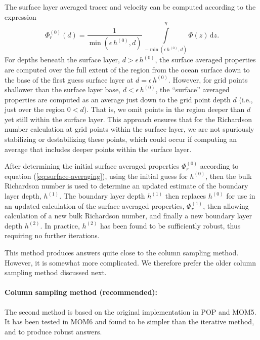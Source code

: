 The surface layer averaged tracer and velocity can be computed
according to the expression
\begin{equation}
   \Phi^{(0)}_{r}(d) = \frac{1}{\min(\epsilon \, h^{(0)}, d)} \, \int\limits^{\eta}_{-\min(\epsilon \, h^{(0)}, d)} \Phi(z) \, \mathrm{d}z.
\label{eq:surface-averaging-iterative}
\end{equation}
For depths beneath the surface layer, $d > \epsilon \, h^{(0)}$, the
surface averaged properties are computed over the full extent of the
region from the ocean surface down to the base of the first guess
surface layer at $d= \epsilon \, h^{(0)}$. However, for grid points
shallower than the surface layer base, $d < \epsilon \, h^{(0)}$, the
``surface'' averaged properties are computed as an average just down
to the grid point depth $d$ (i.e., just over the region $0 < d$).
That is, we omit points in the region deeper than $d$ yet still within
the surface layer.  This approach ensures that for the Richardson
number calculation at grid points within the surface layer, we are not
spuriously stabilizing or destabilizing these points, which could
occur if computing an average that includes deeper points within the
surface layer.

After determining the initial surface averaged properties
$\Phi^{(0)}_{r}$ according to equation (\ref{eq:surface-averaging}),
using the initial guess for $h^{(0)}$, then the bulk Richardson number
is used to determine an updated estimate of the boundary layer depth,
$h^{(1)}$.  The boundary layer depth $h^{(1)}$ then replaces $h^{(0)}$
for use in an updated calculation of the surface averaged properties,
$\Phi^{(1)}_{r}$, then allowing calculation of a new bulk Richardson
number, and finally a new boundary layer depth $h^{(2)}$.  In
practice, $h^{(2)}$ has been found to be sufficiently robust, thus
requiring no further iterations.  

This method produces answers quite close to the column sampling
method.  However, it is somewhat more complicated.  We therefore
prefer the older column sampling method discussed next. 


\paragraph{Column sampling method (recommended):} 
The second method is based on the original implementation in POP and
MOM5.  It has been tested in MOM6 and found to be simpler than the
iterative method, and to produce robust answers.

